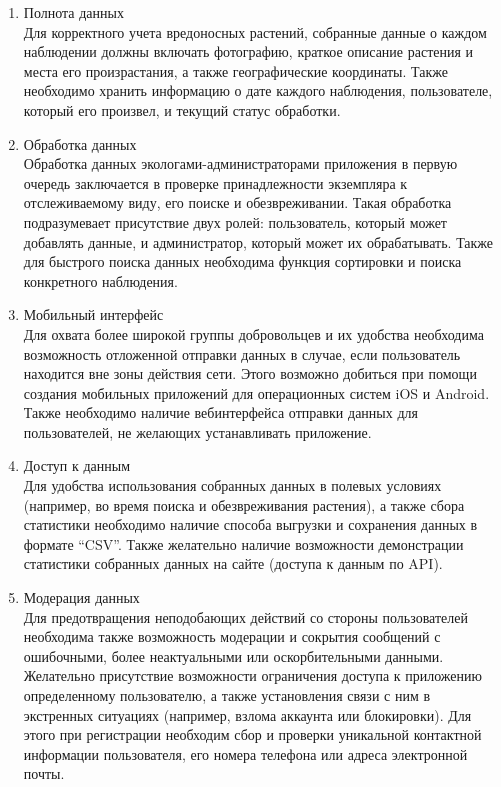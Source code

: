 \begin{enumerate}[topsep=0pt, parsep=0pt, itemsep=0pt, wide=0.5cm]
	\item Полнота данных \\
	Для корректного учета вредоносных растений, собранные данные о каждом наблюдении должны включать фотографию, краткое описание растения и места его произрастания, а также географические координаты.
	Также необходимо хранить информацию о дате каждого наблюдения, пользователе, который его произвел, и текущий статус обработки.
	\item Обработка данных \\
	Обработка данных экологами-администраторами приложения в первую очередь заключается в проверке принадлежности экземпляра к отслеживаемому виду, его поиске и обезвреживании.
	Такая обработка подразумевает присутствие двух ролей: пользователь, который может добавлять данные, и администратор, который может их обрабатывать.
	Также для быстрого поиска данных необходима функция сортировки и поиска конкретного наблюдения.
	\item Мобильный интерфейс \\
	Для охвата более широкой группы добровольцев и их удобства необходима возможность отложенной отправки данных в случае, если пользователь находится вне зоны действия сети.
	Этого возможно добиться при помощи создания мобильных приложений для операционных систем iOS и Android.
	Также необходимо наличие вебинтерфейса отправки данных для пользователей, не желающих устанавливать приложение.
	\item Доступ к данным \\
	Для удобства использования собранных данных в полевых условиях (например, во время поиска и обезвреживания растения), а также сбора статистики необходимо наличие способа выгрузки и сохранения данных в формате “CSV”.
	Также желательно наличие возможности демонстрации статистики собранных данных на сайте (доступа к данным по API).
	\item Модерация данных \\
	Для предотвращения неподобающих действий со стороны пользователей необходима также возможность модерации и сокрытия сообщений с ошибочными, более неактуальными или оскорбительными данными.
	Желательно присутствие возможности ограничения доступа к приложению определенному пользователю, а также установления связи с ним в экстренных ситуациях (например, взлома аккаунта или блокировки).
	Для этого при регистрации необходим сбор и проверки уникальной контактной информации пользователя, его номера телефона или адреса электронной почты.
\end{enumerate}

